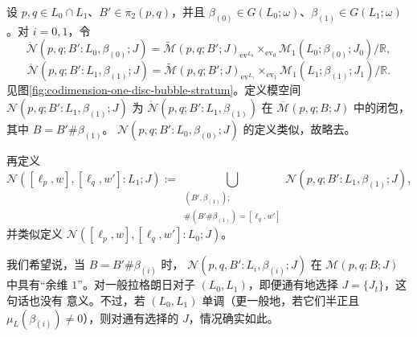 \begin{definition}
\label{def:disc-bubble-boundary-strata}
设 $p,q\in L_0\cap L_1$、$B'\in\pi_2(p,q)$，并且
$\beta_{(0)}\in G(L_0;\omega)$、$\beta_{(1)}\in G(L_1;\omega)$。对
$i=0,1$，令
\[
 \mathring{\mathcal N}(p,q;B':L_0,\beta_{(0)};J)
 =\widetilde{\mathcal M}(p,q;B';J)_{\operatorname{ev}^{L_0}}
 \!\times_{\operatorname{ev}_0}\mathcal M_1(L_0;\beta_{(0)};J_0)/\mathbb R,
\]
\[
 \mathring{\mathcal N}(p,q;B':L_1,\beta_{(1)};J)
 =\widetilde{\mathcal M}(p,q;B';J)_{\operatorname{ev}^{L_1}}
 \!\times_{\operatorname{ev}_1}\mathcal M_1(L_1;\beta_{(1)};J_1)/\mathbb R.
\]
见图\ref{fig:codimension-one-disc-bubble-stratum}。定义模空间
$\mathcal N(p,q;B':L_1,\beta_{(1)};J)$ 为
$\mathring{\mathcal N}(p,q;B':L_1,\beta_{(1)})$ 在
$\overline{\mathcal M}(p,q;B;J)$ 中的闭包，其中 $B=B'\#\beta_{(1)}$。
$\mathcal N(p,q;B':L_0,\beta_{(0)};J)$ 的定义类似，故略去。
\end{definition}

再定义
\begin{equation}
 \mathcal N([\ell_p,w],[\ell_q,w']:L_1;J)
 :=\bigcup_{\substack{(B',\beta_{(1)});\\
 [\ell_p,w]\#(B'\#\beta_{(1)})=[\ell_q,w']}}
 \mathcal N(p,q;B':L_1,\beta_{(1)};J),
\label{eq:total-disc-bubble-stratum}
\end{equation}
并类似定义 $\mathcal N([\ell_p,w],[\ell_q,w']:L_0;J)$。

我们希望说，当 $B=B'\#\beta_{(i)}$ 时，
$\mathcal N(p,q,B':L_i,\beta_{(i)};J)$ 在 $\mathcal M(p,q;B;J)$ 中具有“余维
$1$”。对一般拉格朗日对子 $(L_0,L_1)$，即便通有地选择 $J=\{J_t\}$，这句话也没有
意义。不过，若 $(L_0,L_1)$ 单调（更一般地，若它们半正且
$\mu_L(\beta_{(i)})\neq0$），则对通有选择的 $J$，情况确实如此。

